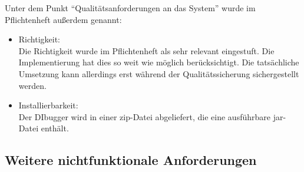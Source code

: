 \documentclass[parskip=full]{scrartcl}
\begin{document}
		Unter dem Punkt \enquote{Qualitätsanforderungen an das System} wurde im Pflichtenheft außerdem genannt:
		\begin{itemize}
		\item Richtigkeit: \\
		Die Richtigkeit wurde im Pflichtenheft als sehr relevant eingestuft. Die Implementierung hat dies so weit wie möglich berücksichtigt. Die tatsächliche Umsetzung kann allerdings erst während der Qualitätssicherung sichergestellt werden.
		\item Installierbarkeit: \\
Der DIbugger wird in einer zip-Datei abgeliefert, die eine ausführbare jar-Datei enthält.		
		
		\end{itemize}
		
		\subsection{Weitere nichtfunktionale Anforderungen}
\end{document}
